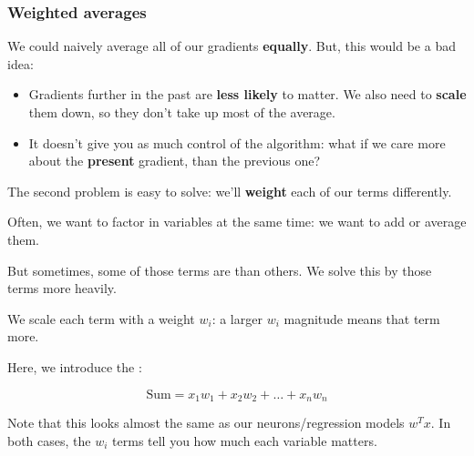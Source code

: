         \subsubsection{Weighted averages}
        
            We could naively average all of our gradients \textbf{equally}. But, this would be a bad idea:
            
            \begin{itemize}
                \item Gradients further in the past are \textbf{less likely} to matter. We also need to \textbf{scale} them down, so they don't take up most of the average.
                    
                \item It doesn't give you as much control of the algorithm: what if we care more about the \textbf{present} gradient, than the previous one?
            \end{itemize}
            
            The second problem is easy to solve: we'll \textbf{weight} each of our terms differently.\\
            
            \begin{concept}
                Often, we want to factor in  variables at the same time: we want to add or average them.
                
                But sometimes, some of those terms are  than others. We solve this by  those terms more heavily.
                
                We scale each term with a weight $w_i$: a larger $w_i$ magnitude means that term  more.
                
                Here, we introduce the :
                
                \begin{equation*}
                    \text{Sum} = x_1w_1 + x_2w_2 + \dots + x_nw_n
                \end{equation*}
    
            \end{concept}
            
            \miniex Note that this looks almost the same as our neurons/regression models $w^Tx$. In both cases, the $w_i$ terms tell you how much each variable matters.
            
